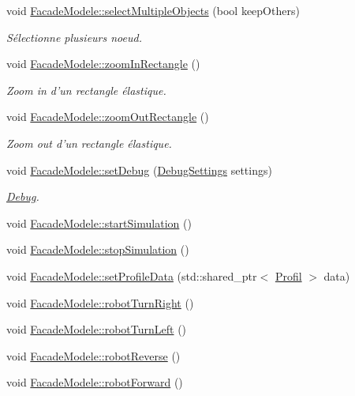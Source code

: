 \begin{DoxyCompactItemize}
void \hyperlink{group__inf2990_ga7cbdab19081ab5e385cff2862e0642cd}{Facade\-Modele\-::select\-Multiple\-Objects} (bool keep\-Others)
\begin{DoxyCompactList}\small\item\em Sélectionne plusieurs noeud. \end{DoxyCompactList}\item 
void \hyperlink{group__inf2990_ga10c88f159ad8d8ff9b17927d7ca50a0e}{Facade\-Modele\-::zoom\-In\-Rectangle} ()
\begin{DoxyCompactList}\small\item\em Zoom in d'un rectangle élastique. \end{DoxyCompactList}\item 
void \hyperlink{group__inf2990_ga9b2a60b7b9392f6284e2fb7560e9c7f8}{Facade\-Modele\-::zoom\-Out\-Rectangle} ()
\begin{DoxyCompactList}\small\item\em Zoom out d'un rectangle élastique. \end{DoxyCompactList}\item 
void \hyperlink{group__inf2990_gac2d5a39c52437e295131acc35834be37}{Facade\-Modele\-::set\-Debug} (\hyperlink{struct_debug_settings}{Debug\-Settings} settings)
\begin{DoxyCompactList}\small\item\em \hyperlink{class_debug}{Debug}. \end{DoxyCompactList}\item 
void \hyperlink{group__inf2990_ga740a421946d07eead14da960843da348}{Facade\-Modele\-::start\-Simulation} ()
\item 
void \hyperlink{group__inf2990_gab38182bf38d343b899e9e9ee533529d9}{Facade\-Modele\-::stop\-Simulation} ()
\item 
void \hyperlink{group__inf2990_ga5c5c0316590a27089e3d97b0d4b65c62}{Facade\-Modele\-::set\-Profile\-Data} (std\-::shared\-\_\-ptr$<$ \hyperlink{struct_profil}{Profil} $>$ data)
\item 
void \hyperlink{group__inf2990_gad7ed7270a0485181ddcce168ef035db9}{Facade\-Modele\-::robot\-Turn\-Right} ()
\item 
void \hyperlink{group__inf2990_ga315a7219bfaadcf4b5667aa26e715a59}{Facade\-Modele\-::robot\-Turn\-Left} ()
\item 
void \hyperlink{group__inf2990_ga0337e81d62cf2a38aace4b6bc0a9056a}{Facade\-Modele\-::robot\-Reverse} ()
\item 
void \hyperlink{group__inf2990_ga7d7a91c04dd796ce9db41286868b092c}{Facade\-Modele\-::robot\-Forward} ()

\end{DoxyCompactItemize}
